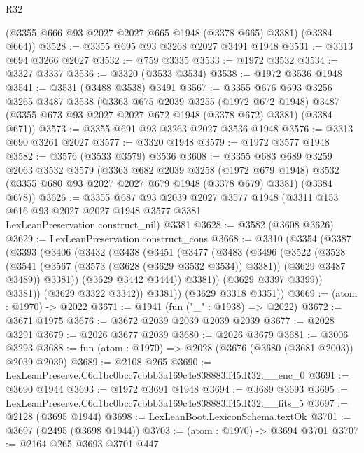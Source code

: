 \begin{lexlean}{R32}
\begin{coremodule}
      (@3355 @666 @93 @2027 @2027 @665 @1948 (@3378 @665) @3381)
      (@3384 @664))
@3528 := @3355 @695 @93 @3268 @2027 @3491 @1948
@3531 := @3313 @694 @3266 @2027
@3532 := @759 @3335
@3533 := @1972 @3532
@3534 := @3327 @3337
@3536 := @3320 (@3533 @3534)
@3538 := @1972 @3536 @1948
@3541 := @3531 (@3488 @3538) @3491
@3567 := @3355
    @676
    @693
    @3256
    @3265
    @3487
    @3538
    (@3363
      @675
      @2039
      @3255
      (@1972 @672 @1948)
      @3487
      (@3355 @673 @93 @2027 @2027 @672 @1948 (@3378 @672) @3381)
      (@3384 @671))
@3573 := @3355 @691 @93 @3263 @2027 @3536 @1948
@3576 := @3313 @690 @3261 @2027
@3577 := @3320 @1948
@3579 := @1972 @3577 @1948
@3582 := @3576 (@3533 @3579) @3536
@3608 := @3355
    @683
    @689
    @3259
    @2063
    @3532
    @3579
    (@3363
      @682
      @2039
      @3258
      (@1972 @679 @1948)
      @3532
      (@3355 @680 @93 @2027 @2027 @679 @1948 (@3378 @679) @3381)
      (@3384 @678))
@3626 := @3355
    @687
    @93
    @2039
    @2027
    @3577
    @1948
    (@3311 @153 @616 @93 @2027 @2027 @1948 @3577 @3381 LexLeanPreservation.construct_nil)
    @3381
@3628 := @3582 (@3608 @3626)
@3629 := LexLeanPreservation.construct_cons
@3668 := @3310
    (@3354
      (@3387
        (@3393
          (@3406
            (@3432
              (@3438
                (@3451
                  (@3477
                    (@3483
                      (@3496
                        (@3522
                          (@3528
                            (@3541
                              (@3567 (@3573 (@3628 (@3629 @3532 @3534)) @3381))
                              (@3629 @3487 @3489))
                            @3381))
                        (@3629 @3442 @3444))
                      @3381))
                  (@3629 @3397 @3399))
                @3381))
            (@3629 @3322 @3342))
          @3381))
      (@3629 @3318 @3351))
@3669 := (atom : @1970) -> @2022
@3671 := @1941 (fun ("_" : @1938) => @2022)
@3672 := @3671 @1975
@3676 := @3672 @2039 @2039 @2039 @2039
@3677 := @2028 @3291
@3679 := @2026 @3677 @2039
@3680 := @2026 @3679
@3681 := @3006 @3293
@3688 := fun (atom : @1970) => @2028 (@3676 (@3680 (@3681 @2003)) @2039 @2039)
@3689 := @2108 @265
@3690 := LexLeanPreserve.C6d1bc0bcc7cbbb3a169c4e838883ff45.R32.__enc_0
@3691 := @3690 @1944
@3693 := @1972 @3691 @1948
@3694 := @3689 @3693
@3695 := LexLeanPreserve.C6d1bc0bcc7cbbb3a169c4e838883ff45.R32.__fits_5
@3697 := @2128 (@3695 @1944)
@3698 := LexLeanBoot.LexiconSchema.textOk
@3701 := @3697 (@2495 (@3698 @1944))
@3703 := (atom : @1970) -> @3694 @3701
@3707 := @2164 @265 @3693 @3701 @447

\end{coremodule}
\end{lexlean}
